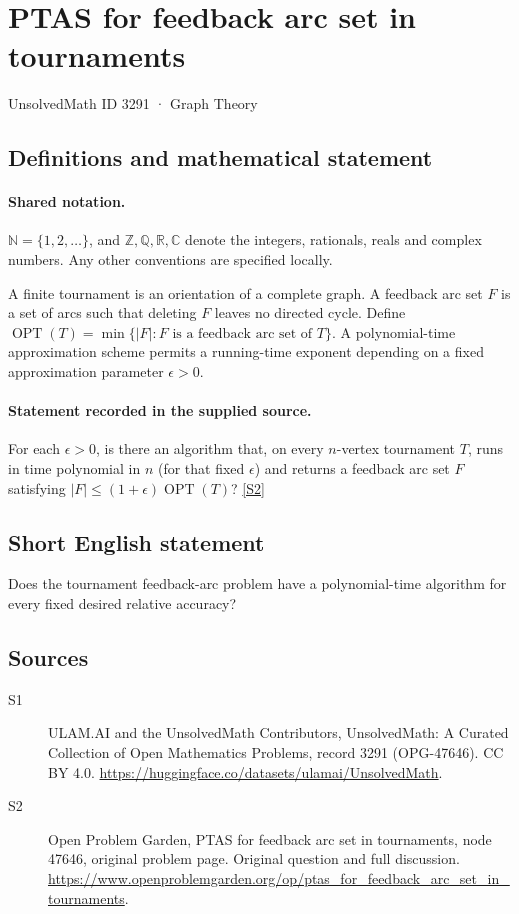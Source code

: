 \documentclass[11pt]{article}
\newcommand{\sref}[2]{\hyperlink{source:#1:#2}{[S#2]}}
\begin{document}
\setcounter{section}{3290}
\section{PTAS for feedback arc set in tournaments}\label{3291}
{\small\sffamily UnsolvedMath ID 3291 · Graph Theory}
\subsection{Definitions and mathematical statement}

\paragraph{Shared notation.}$\mathbb N=\{1,2,\ldots\}$, and $\mathbb Z,\mathbb Q,\mathbb R,\mathbb C$ denote the integers, rationals, reals and complex numbers. Any other conventions are specified locally.


A finite tournament is an orientation of a complete graph. A feedback arc set $F$ is a set of arcs such that deleting $F$ leaves no directed cycle. Define $\operatorname{OPT}(T)=\min\{|F|:F\text{ is a feedback arc set of }T\}$. A polynomial-time approximation scheme permits a running-time exponent depending on a fixed approximation parameter $\epsilon>0$.
\paragraph{Statement recorded in the supplied source.}
For each $\epsilon>0$, is there an algorithm that, on every $n$-vertex tournament $T$, runs in time polynomial in $n$ (for that fixed $\epsilon$) and returns a feedback arc set $F$ satisfying $|F|\leq(1+\epsilon)\operatorname{OPT}(T)$? \sref{3291}{2}
\subsection{Short English statement}
Does the tournament feedback-arc problem have a polynomial-time algorithm for every fixed desired relative accuracy?
\subsection{Sources}
\begin{description}
\item[\hypertarget{source:3291:1}{S1}] ULAM.AI and the UnsolvedMath Contributors, UnsolvedMath: A Curated Collection of Open Mathematics Problems, record 3291 (OPG-47646). CC BY 4.0. \url{https://huggingface.co/datasets/ulamai/UnsolvedMath}.
\item[\hypertarget{source:3291:2}{S2}] Open Problem Garden, PTAS for feedback arc set in tournaments, node 47646, original problem page. Original question and full discussion. \url{https://www.openproblemgarden.org/op/ptas_for_feedback_arc_set_in_tournaments}.

\end{description}
\label{end:3291}
\end{document}
